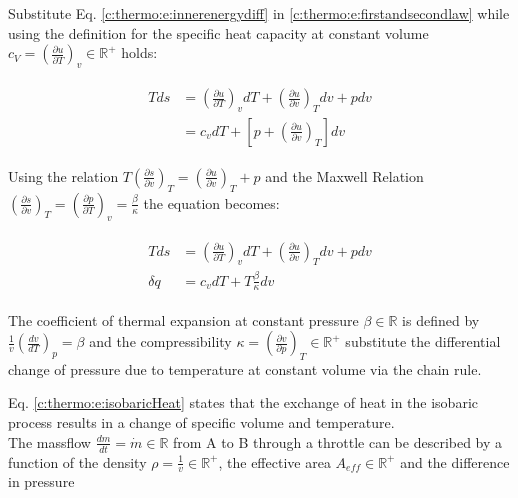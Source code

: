 Substitute Eq. \ref{c:thermo:e:innerenergydiff} in \ref{c:thermo:e:firstandsecondlaw} while using the definition for the specific heat capacity at constant volume $c_V = \left(\frac{\partial u}{\partial T}\right)_v \in \mathbb{R}^+$ holds:

\begin{align*}
\begin{split}
T ds &= \left( \frac{\partial u}{\partial T} \right)_v dT  + \left( \frac{\partial u}{ \partial v} \right)_T dv + p dv \\
&= c_v dT + \left[ p + \left( \frac{\partial u}{\partial v}\right)_T\right] dv
\end{split}
\end{align*}

Using the relation \cite[p.375]{Struchtrup2014ThermodynamicsConversion} $T\left( \frac{\partial s}{\partial v}\right)_T = \left( \frac{\partial u}{\partial v}\right)_T + p $ and the Maxwell Relation $\left( \frac{\partial s}{\partial v}\right)_T = \left( \frac{\partial p}{\partial T}\right)_v = \frac{\beta}{\kappa} $ the equation becomes:

\begin{align}
\begin{split}
T ds &= \left( \frac{\partial u}{\partial T} \right)_v dT  + \left( \frac{\partial u}{ \partial v} \right)_T dv + p dv \\
\delta q &= c_v dT + T \frac{\beta}{\kappa} dv
\end{split}
\label{c:thermo:e:isobaricHeat}
\end{align}

The coefficient of thermal expansion at constant pressure $\beta \in \mathbb{R}$ is defined by $\frac{1}{v}\left( \frac{dv}{dT} \right)_p = \beta$ and the compressibility $\kappa = \left( \frac{\partial v}{\partial p} \right)_T \in \mathbb{R}^+$ substitute the differential change of pressure due to temperature at constant volume via the chain rule.\newline

Eq. \ref{c:thermo:e:isobaricHeat} states that the exchange of heat in the isobaric process results in a change of specific volume and temperature. \\

The massflow $\frac{dm}{dt} = \dot{m} \in \mathbb{R}$ from A to B through a throttle can be described by a function of the density $\rho = \frac{1}{v} \in \mathbb{R}^+$, the effective area $A_{eff} \in \mathbb{R}^+$ and the difference in pressure 

